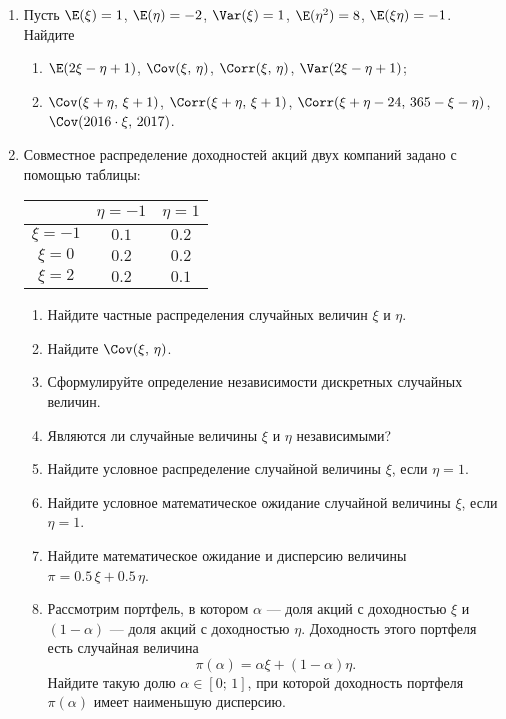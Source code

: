 \begin{enumerate}
\item Пусть $\E(\xi) = 1$, $\E(\eta) = -2$, $\Var(\xi) = 1$, $\E(\eta^2) = 8$, $\E(\xi \eta) = -1$. Найдите
\begin{enumerate}
\item $\E(2\xi-\eta+1)$, $\Cov(\xi, \,\eta)$, $\Corr(\xi, \,\eta)$,  $\Var(2\xi-\eta+1)$;
\item $\Cov(\xi+\eta, \,\xi+1)$, $\Corr(\xi+\eta, \,\xi+1)$, $\Corr(\xi+\eta-24, \,365 - \xi - \eta)$, $\Cov(2016\cdot\xi, \, 2017)$.
\end{enumerate}

\item
Совместное распределение доходностей акций двух компаний задано с помощью таблицы:

\begin{center}
\begin{tabular}{ccc}
\toprule
         & $\eta=-1$ & $\eta=1$ \\
\midrule
$\xi=-1$  & $0.1$       & $0.2$   \\
$\xi=0$   & $0.2$       & $0.2$   \\
$\xi=2$   & $0.2$       & $0.1$   \\
\bottomrule
\end{tabular}
\end{center}

\begin{enumerate}
  \item Найдите частные распределения случайных величин $\xi$ и $\eta$.
  \item Найдите $\Cov(\xi,\,\eta)$.
  \item Сформулируйте определение независимости дискретных случайных величин.
  \item Являются ли случайные величины $\xi$ и $\eta$ независимыми?
  \item Найдите условное распределение случайной величины $\xi$, если $\eta = 1$.
  \item Найдите условное математическое ожидание случайной величины $\xi$, если $\eta = 1$.
  \item Найдите математическое ожидание и дисперсию величины $\pi = 0.5\, \xi + 0.5\, \eta$.
  \item Рассмотрим портфель, в котором $\alpha$ — доля акций с доходностью $\xi$ и $(1 - \alpha)$ — доля акций с доходностью $\eta$. Доходность этого портфеля есть случайная величина
  \[\pi(\alpha) = \alpha \xi + (1-\alpha)\eta.\]
  Найдите такую долю $\alpha \in [0;\,1]$, при которой доходность портфеля $\pi(\alpha)$ имеет наименьшую дисперсию.
\end{enumerate}


\end{enumerate}
